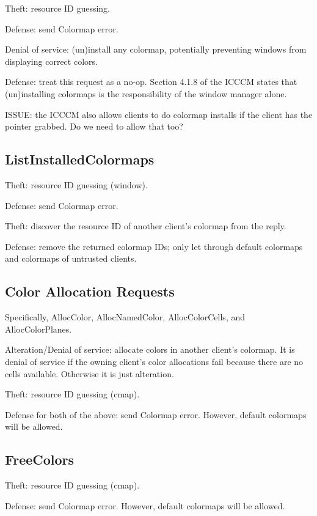 \documentclass{article}
\begin{document}
Theft: resource ID guessing.

Defense: send Colormap error.

Denial of service: (un)install any colormap, potentially preventing
windows from displaying correct colors.

Defense: treat this request as a no-op.  Section 4.1.8 of the ICCCM
states that (un)installing colormaps is the responsibility of the window
manager alone.

ISSUE: the ICCCM also allows clients to do colormap installs if the
client has the pointer grabbed.  Do we need to allow that too?



\subsection{ListInstalledColormaps}

Theft: resource ID guessing (window).

Defense: send Colormap error.

Theft: discover the resource ID of another client's colormap
from the reply.

Defense: remove the returned colormap IDs; only let through default
colormaps and colormaps of untrusted clients.



\subsection{Color Allocation Requests}

Specifically, AllocColor, AllocNamedColor, AllocColorCells, and
AllocColorPlanes.

Alteration/Denial of service: allocate colors in another client's
colormap.  It is denial of service if the owning client's color
allocations fail because there are no cells available.  Otherwise it
is just alteration.

Theft: resource ID guessing (cmap).

Defense for both of the above: send Colormap error.  However, default
colormaps will be allowed.



\subsection{FreeColors}

Theft: resource ID guessing (cmap).

Defense: send Colormap error.  However, default colormaps will be
allowed.
\end{document}
